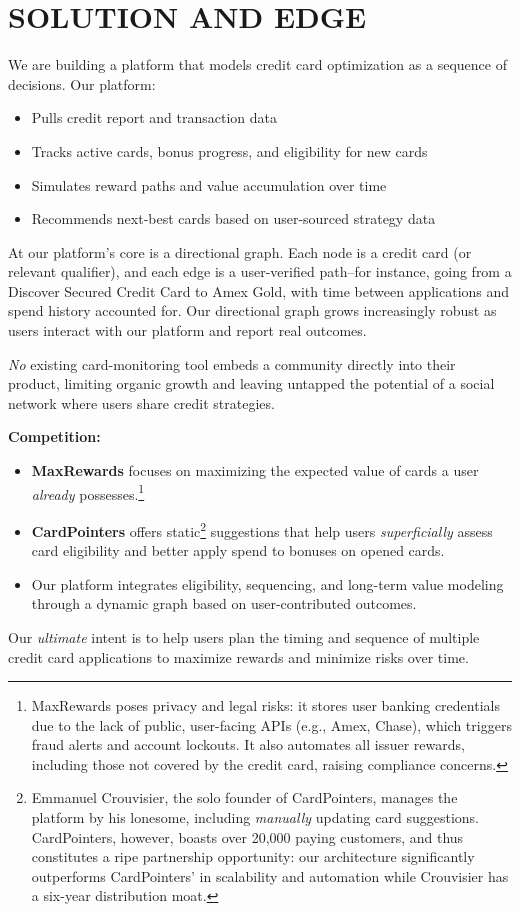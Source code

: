 \section{SOLUTION AND EDGE}
We are building a platform that models credit card optimization as a sequence of decisions. Our platform:
\vspace{-0.5em}
\begin{itemize}[noitemsep]
    \item Pulls credit report and transaction data
    \item Tracks active cards, bonus progress, and eligibility for new cards
    \item Simulates reward paths and value accumulation over time
    \item Recommends next-best cards based on user-sourced strategy data
\end{itemize}
\vspace{-0.5em}
At our platform's core is a directional graph. Each node is a credit card (or relevant qualifier), and each edge is a user-verified path--for instance, going from a Discover Secured Credit Card to Amex Gold, with time between applications and spend history accounted for. Our directional graph grows increasingly robust as users interact with our platform and report real outcomes. 

\textit{No} existing card-monitoring tool embeds a community directly into their product, limiting organic growth and leaving untapped the potential of a social network where users share credit strategies.

\textbf{Competition:}
\vspace{-0.5em}
\begin{itemize}[noitemsep]
\item \textbf{MaxRewards} focuses on maximizing the expected value of cards a user \textit{already} possesses.\footnote{MaxRewards poses privacy and legal risks: it stores user banking credentials due to the lack of public, user-facing APIs (e.g., Amex, Chase), which triggers fraud alerts and account lockouts. It also automates all issuer rewards, including those not covered by the credit card, raising compliance concerns.}
\item \textbf{CardPointers} offers static\footnote{Emmanuel Crouvisier, the solo founder of CardPointers, manages the platform by his lonesome, including \textit{manually} updating card suggestions. CardPointers, however, boasts over 20,000 paying customers, and thus constitutes a ripe partnership opportunity: our architecture significantly outperforms CardPointers' in scalability and automation while Crouvisier has a six-year distribution moat.} suggestions that help users \textit{superficially} assess card eligibility and better apply spend to bonuses on opened cards.
\item Our platform integrates eligibility, sequencing, and long-term value modeling through a dynamic graph based on user-contributed outcomes.
\end{itemize}
\vspace{-0.5em}
Our \textit{ultimate} intent is to help users plan the timing and sequence of multiple credit card applications to maximize rewards and minimize risks over time.


